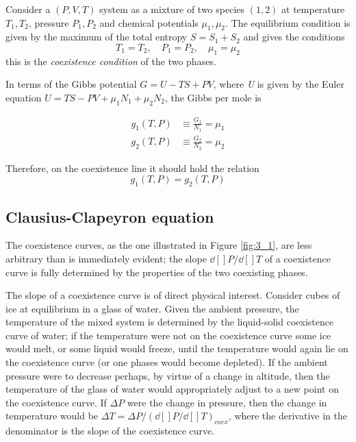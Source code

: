 \documentclass[../../Main/Main.tex]{subfiles}
\begin{document}
Consider a \( (P,V,T) \) system as a mixture of two species \( (1,2) \) at temperature \( T_1, T_2 \), pressure \( P_1, P_2 \) and chemical potentials \( \mu _1,\mu _2 \). The equilibrium condition is given by the maximum of the total entropy \( S = S_1 + S_2 \) and gives the conditions
\begin{equation}
  T_1 = T_2, \quad P_1 = P_2, \quad \mu _1 = \mu _2
  \label{eq:}
\end{equation}
this is the \emph{coexistence condition} of the two phases.

In terms of the Gibbs potential \( G = U- TS+PV \), where \emph{U} is given by  the Euler equation \( U = TS-PV+ \mu _1 N_1 + \mu _2 N_2 \), the Gibbs per mole is

\begin{align}
  g_1 (T,P) &\equiv \frac{G_1}{N_1} = \mu _1 \\
  g_2 (T,P) &\equiv \frac{G_2}{N_2} = \mu _2
\end{align}

Therefore, on the coexistence line it should hold the relation
\begin{equation}
  g_1 (T,P) = g_2 (T,P)
\end{equation}

\subsection{Clausius-Clapeyron equation}
The coexistence curves, as the one illustrated in Figure  \ref{fig:3_1}, are less arbitrary than is immediately evident; the slope \( \dd[]{P} /\dd[]{T}   \) of a coexistence curve is fully determined by the properties of the two coexisting phases.

The slope of a coexistence curve is of direct physical interest. Consider cubes of ice at equilibrium in a glass of water. Given the ambient pressure, the temperature of the mixed system is determined by the liquid-solid coexistence curve of water; if the temperature were not on the coexistence curve some ice would melt, or some liquid would freeze, until the temperature would again lie on the coexistence curve (or one phases would become depleted). If the ambient pressure were to decrease perhaps, by virtue of a change in altitude, then the temperature of the glass of water would appropriately adjust to a new point on the coexistence curve. If \( \Delta P \) were the change in pressure, then the change in temperature would be \( \Delta T = \Delta P / (\dd[]{P} /\dd[]{T})_{coex} \), where the derivative in the denominator is the slope of the coexistence curve.
\end{document}
